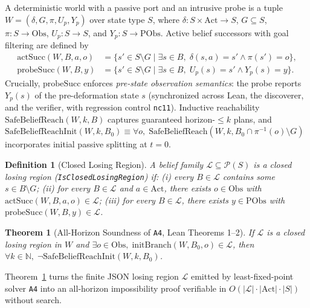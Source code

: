 \documentclass[10pt,a4paper]{article}
\newcommand{\code}[1]{\nolinkurl{#1}}
\newtheorem{definition}{Definition}[section]
\newtheorem{theorem}{Theorem}[section]
\begin{document}
A deterministic world with a passive port and an intrusive probe is a tuple $W = (\delta, G, \pi, U_p, Y_p)$ over state type $S$, where $\delta: S \times \mathrm{Act} \to S$, $G \subseteq S$, $\pi: S \to \mathrm{Obs}$, $U_p: S \to S$, and $Y_p: S \to \mathrm{PObs}$. Active belief successors with goal filtering are defined by
\begin{align*}
\mathrm{actSucc}(W, B, a, o) &= \{ s' \in S \setminus G \mid \exists s \in B,\; \delta(s, a) = s' \land \pi(s') = o \}, \\
\mathrm{probeSucc}(W, B, y)  &= \{ s' \in S \setminus G \mid \exists s \in B,\; U_p(s) = s' \land Y_p(s) = y \}.
\end{align*}
Crucially, $\mathrm{probeSucc}$ enforces \emph{pre-state observation semantics}: the probe reports $Y_p(s)$ of the pre-deformation state $s$ (synchronized across Lean, the discoverer, and the verifier, with regression control \code{nc11}). Inductive reachability $\mathrm{SafeBeliefReach}(W, k, B)$ captures guaranteed horizon-$\le k$ plans, and $\mathrm{SafeBeliefReachInit}(W, k, B_0) \equiv \forall o,\; \mathrm{SafeBeliefReach}(W, k, B_0 \cap \pi^{-1}(o) \setminus G)$ incorporates initial passive splitting at $t=0$.

\begin{definition}[Closed Losing Region]\label{def:clr}
A belief family $\mathcal{L} \subseteq \mathcal{P}(S)$ is a \emph{closed losing region} (\code{IsClosedLosingRegion}) if:
(i) every $B \in \mathcal{L}$ contains some $s \in B \setminus G$;
(ii) for every $B \in \mathcal{L}$ and $a \in \mathrm{Act}$, there exists $o \in \mathrm{Obs}$ with $\mathrm{actSucc}(W,B,a,o) \in \mathcal{L}$;
(iii) for every $B \in \mathcal{L}$, there exists $y \in \mathrm{PObs}$ with $\mathrm{probeSucc}(W,B,y) \in \mathcal{L}$.
\end{definition}

\begin{theorem}[All-Horizon Soundness of \code{A4}, Lean Theorems 1--2]\label{thm:a4}
If $\mathcal{L}$ is a closed losing region in $W$ and $\exists o \in \mathrm{Obs},\; \mathrm{initBranch}(W, B_0, o) \in \mathcal{L}$, then $\forall k \in \mathbb{N},\; \neg\mathrm{SafeBeliefReachInit}(W, k, B_0)$.
\end{theorem}

Theorem~\ref{thm:a4} turns the finite JSON losing region $\mathcal{L}$ emitted by least-fixed-point solver \code{A4} into an all-horizon impossibility proof verifiable in $O(|\mathcal{L}|\cdot|\mathrm{Act}|\cdot|S|)$ without search.
\end{document}
